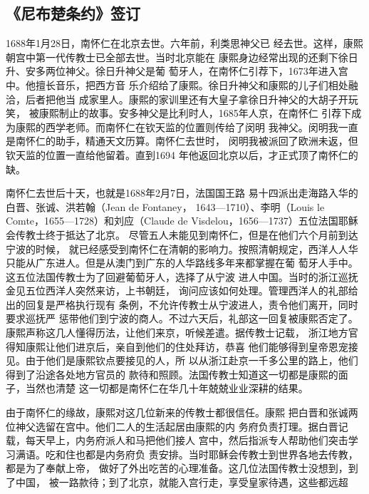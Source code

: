 \subsection{《尼布楚条约》签订}
\par
1688年1月28日，南怀仁在北京去世。六年前，利类思神父已%
经去世。这样，康熙朝宫中第一代传教士已全部去世。当时北京能在%
康熙身边经常出现的还剩下徐日升、安多两位神父。徐日升神父是葡%
萄牙人，在南怀仁引荐下，1673年进入宫中。他擅长音乐，把西方音%
乐介绍给了康熙。徐日升神父和康熙的儿子们相处融洽，后者把他当%
成家里人。康熙的家训里还有大皇子拿徐日升神父的大胡子开玩笑，%
被康熙制止的故事。安多神父是比利时人，1685年人京，在南怀仁%
引荐下成为康熙的西学老师。而南怀仁在钦天监的位置则传给了闵明%
我神父。闵明我一直是南怀仁的助手，精通天文历算。南怀仁去世时，%
闵明我被派回了欧洲未返，但钦天监的位置一直给他留着。直到1694%
年他返回北京以后，才正式顶了南怀仁的缺。%
\par
南怀仁去世后十天，也就是1688年2月7日，法国国王路%
易十四派出走海路入华的白晋、张诚、洪若翰（Jean de Fontaney，%
1643—1710）、李明（Louis le Comte，1655—1728）和刘应（Claude%
\space%
de Visdelou，1656—1737）五位法国耶稣会传教士终于抵达了北京。%
尽管五人未能见到南怀仁，但是在他们六个月前到达宁波的时候，%
就已经感受到南怀仁在清朝的影响力。按照清朝规定，西洋人人华%
只能从广东进人。但是从澳门到广东的人华路线多年来都掌握在葡%
萄牙人手中。这五位法国传教士为了回避葡萄牙人，选择了从宁波%
进人中国。当时的浙江巡抚金见五位西洋人突然来访，上书朝廷，%
询问应该如何处理。管理西洋人的礼部给出的回复是严格执行现有%
条例，不允许传教士从宁波进人，责令他们离开，同时要求巡抚严%
惩带他们到宁波的商人。不过六天后，礼部这一回复被康熙否定了。%
康熙声称这几人懂得历法，让他们来京，听候差遣。据传教士记载，%
浙江地方官得知康熙让他们进京后，亲自到他们的住处拜访，恭喜%
他们能够得到皇帝恩宠接见。由于他们是康熙钦点要接见的人，所%
以从浙江赴京一千多公里的路上，他们得到了沿途各处地方官员的%
款待和照顾。法国传教士知道这一切都是康熙的面子，当然也清楚%
这一切都是南怀仁在华几十年兢兢业业深耕的结果。%
\par
由于南怀仁的缘故，康熙对这几位新来的传教士都很信任。康熙%
把白晋和张诚两位神父选留在宫中。他们二人的生活起居由康熙的内%
务府负责打理。据白晋记载，每天早上，内务府派人和马把他们接人%
宫中，然后指派专人帮助他们突击学习满语。吃和住也都是内务府负%
责安排。当时耶稣会传教士到世界各地去传教，都是为了奉献上帝，%
做好了外出吃苦的心理准备。这几位法国传教士没想到，到了中国，%
被一路款待；到了北京，就能入宫行走，享受皇家待遇，这些都远超%
